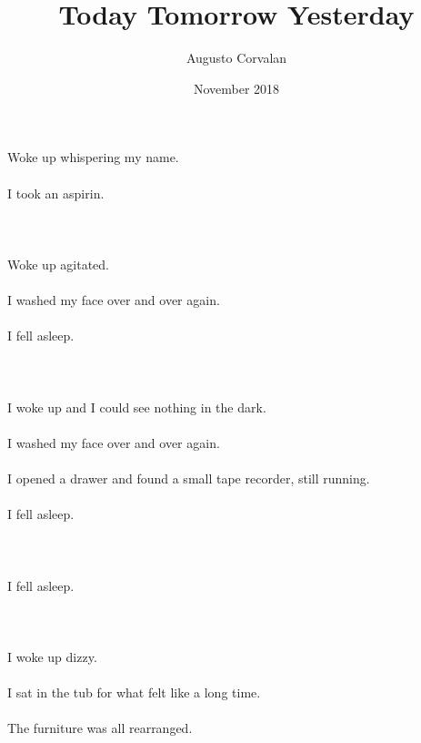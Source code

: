 \documentclass{article}
\title{Today Tomorrow Yesterday}
\date{November 2018}
\author{Augusto Corvalan}
\begin{document}
    
    \section{}
    Woke up whispering my name.\\\\I took an aspirin.\\\\ 
    \newpage
    
    \section{}
    Woke up agitated.\\\\I washed my face over and over again.\\\\I fell asleep.\\\\ 
    \newpage
    
    \section{}
    I woke up and I could see nothing in the dark.\\\\I washed my face over and over again.\\\\I opened a drawer and found a small tape recorder, still running.\\\\I fell asleep.\\\\ 
    \newpage
    
    \section{}
    I fell asleep.\\\\ 
    \newpage
    
    \section{}
    I woke up dizzy.\\\\I sat in the tub for what felt like a long time.\\\\The furniture was all rearranged.\\\\ 
    \newpage
    
\end{document}
